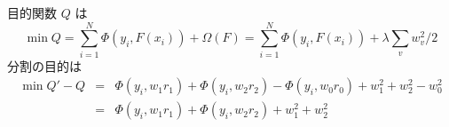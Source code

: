 \begin{tcolorbox}[title={\Large Regularized Greedy Forest}]
	\vspace{40px}
	目的関数 $Q$ は
	\[
		\min Q
		= \sum^N_{i=1} \Phi(y_i, F(x_i)) + \Omega(F)
		= \sum^N_{i=1} \Phi(y_i, F(x_i)) + \lambda \sum_v w_v^2 / 2
	\]
	分割の目的は
	\begin{eqnarray*}
		\min Q' - Q
		&=& \Phi(y_i, w_1 r_1) + \Phi(y_i, w_2 r_2) - \Phi(y_i, w_0 r_0) + w_1^2 + w_2^2 - w_0^2 \\
		&=& \Phi(y_i, w_1 r_1) + \Phi(y_i, w_2 r_2) + w_1^2 + w_2^2 \\
	\end{eqnarray*}

\end{tcolorbox}
